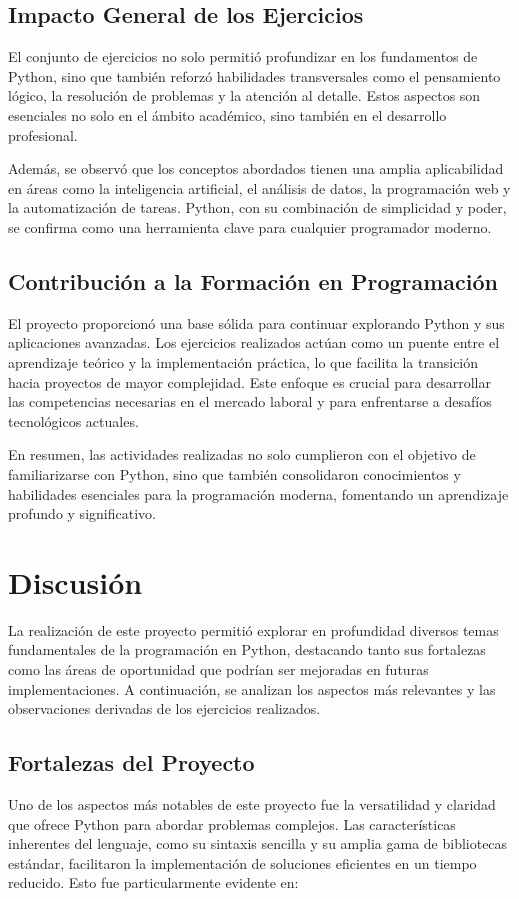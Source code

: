 \documentclass[conference]{IEEEtran}
\begin{document}
\subsection{Impacto General de los Ejercicios}
El conjunto de ejercicios no solo permitió profundizar en los fundamentos de Python, sino que también reforzó habilidades transversales como el pensamiento lógico, la resolución de problemas y la atención al detalle. Estos aspectos son esenciales no solo en el ámbito académico, sino también en el desarrollo profesional.

Además, se observó que los conceptos abordados tienen una amplia aplicabilidad en áreas como la inteligencia artificial, el análisis de datos, la programación web y la automatización de tareas. Python, con su combinación de simplicidad y poder, se confirma como una herramienta clave para cualquier programador moderno.

\subsection{Contribución a la Formación en Programación}
El proyecto proporcionó una base sólida para continuar explorando Python y sus aplicaciones avanzadas. Los ejercicios realizados actúan como un puente entre el aprendizaje teórico y la implementación práctica, lo que facilita la transición hacia proyectos de mayor complejidad. Este enfoque es crucial para desarrollar las competencias necesarias en el mercado laboral y para enfrentarse a desafíos tecnológicos actuales.

En resumen, las actividades realizadas no solo cumplieron con el objetivo de familiarizarse con Python, sino que también consolidaron conocimientos y habilidades esenciales para la programación moderna, fomentando un aprendizaje profundo y significativo.


\section{Discusión}

La realización de este proyecto permitió explorar en profundidad diversos temas fundamentales de la programación en Python, destacando tanto sus fortalezas como las áreas de oportunidad que podrían ser mejoradas en futuras implementaciones. A continuación, se analizan los aspectos más relevantes y las observaciones derivadas de los ejercicios realizados.

\subsection{Fortalezas del Proyecto}
Uno de los aspectos más notables de este proyecto fue la versatilidad y claridad que ofrece Python para abordar problemas complejos. Las características inherentes del lenguaje, como su sintaxis sencilla y su amplia gama de bibliotecas estándar, facilitaron la implementación de soluciones eficientes en un tiempo reducido. Esto fue particularmente evidente en:
\end{document}
